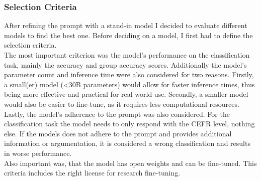 \subsubsection*{Selection Criteria}
\label{sss:selection_criteria}
After refining the prompt with a stand-in model I decided to evaluate different models to find the best one. Before deciding on a model, I first had to define the selection criteria. \\
The most important criterion was the model's performance on the classification task, mainly the accuracy and group accuracy scores.
Additionally the model's parameter count and inference time were also considered for two reasons. Firstly, a small(er) model (<30B parameters) would allow for faster inference times, thus being more effective and practical for real world use. Secondly, a smaller model would also be easier to fine-tune, as it requires less computational resources.  \\
Lastly, the model's adherence to the prompt was also considered. For the classification task the model needs to only respond with the CEFR level, nothing else. If the models does not adhere to the prompt and provides additional information or argumentation, it is considered a wrong classification and results in worse performance. \\
Also important was, that the model has open weights and can be fine-tuned. This criteria includes the right license for research fine-tuning.

